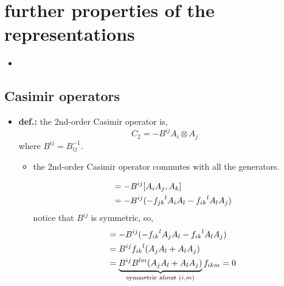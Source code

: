 \chapter{further properties of the representations}
\begin{itemize}
	\item 
\end{itemize}

\section{Casimir operators}
\begin{itemize}
	\item \textbf{\textbf{def.:}} the 2nd-order Casimir operator is,
	\begin{equation}
		C_2 = - B^{i j} A_i \otimes A_j
	\end{equation}
	where $B^{i j} = B^{- 1}_{i j}$.
	\begin{itemize}
		\item the 2nd-order Casimir operator commutes with all the generators.
		
		\begin{tcolorbox}[title=proof:]
			\begin{align}
				[C_2, A_k] &= - B^{i j} [A_i A_j, A_k] \notag \\
				&= - B^{i j} (- {f_{j k}}^l A_i A_l - {f_{i k}}^l A_l A_j)
			\end{align}
			notice that $B^{i j}$ is symmetric, so,
			\begin{align}
				[C_2, A_k] &= - B^{i j} (- {f_{i k}}^l A_j A_l - {f_{i k}}^l A_l A_j) \notag \\
				&= B^{i j} {f_{i k}}^l (A_j A_l + A_l A_j) \notag \\
				&= \underbrace{B^{i j} B^{l m} (A_j A_l + A_l A_j)}_{\text{symmetric about } (i, m)} f_{i k m} = 0
			\end{align}
		\end{tcolorbox}
	\end{itemize}
\end{itemize}
